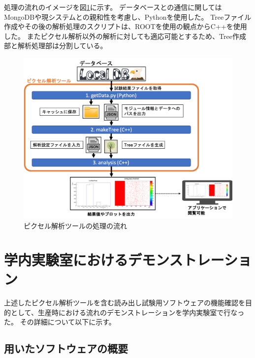 処理の流れのイメージを図\ref{analysis_tool_flow}に示す。
データベースとの通信に関してはMongoDBや現システムとの親和性を考慮し、Pythonを使用した。
Treeファイル作成やその後の解析処理のスクリプトは、ROOTを使用の観点からC++を使用した。
またピクセル解析以外の解析に対しても適応可能とするため、Tree作成部と解析処理部は分割している。

\begin{figure}[bpt]\centering
\includegraphics[width=12cm]{analysis_tool_flow}
\caption[ピクセル解析ツールの処理の流れ]{ピクセル解析ツールの処理の流れ}
\label{analysis_tool_flow}
\end{figure}

\clearpage
\section{学内実験室におけるデモンストレーション}

上述したピクセル解析ツールを含む読み出し試験用ソフトウェアの機能確認を目的として、生産時における流れのデモンストレーションを学内実験室で行なった。
その詳細について以下に示す。

\subsection{用いたソフトウェアの概要}

